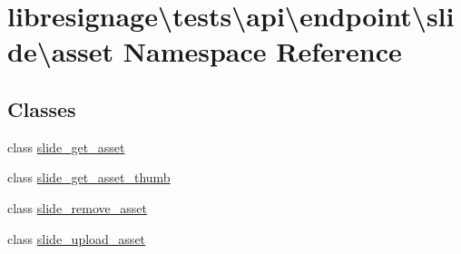 \hypertarget{namespacelibresignage_1_1tests_1_1api_1_1endpoint_1_1slide_1_1asset}{}\section{libresignage\textbackslash{}tests\textbackslash{}api\textbackslash{}endpoint\textbackslash{}slide\textbackslash{}asset Namespace Reference}
\label{namespacelibresignage_1_1tests_1_1api_1_1endpoint_1_1slide_1_1asset}
\subsection*{Classes}
\begin{DoxyCompactItemize}
\item 
class \hyperlink{classlibresignage_1_1tests_1_1api_1_1endpoint_1_1slide_1_1asset_1_1slide__get__asset}{slide\+\_\+get\+\_\+asset}
\item 
class \hyperlink{classlibresignage_1_1tests_1_1api_1_1endpoint_1_1slide_1_1asset_1_1slide__get__asset__thumb}{slide\+\_\+get\+\_\+asset\+\_\+thumb}
\item 
class \hyperlink{classlibresignage_1_1tests_1_1api_1_1endpoint_1_1slide_1_1asset_1_1slide__remove__asset}{slide\+\_\+remove\+\_\+asset}
\item 
class \hyperlink{classlibresignage_1_1tests_1_1api_1_1endpoint_1_1slide_1_1asset_1_1slide__upload__asset}{slide\+\_\+upload\+\_\+asset}
\end{DoxyCompactItemize}

